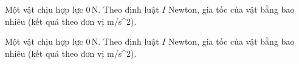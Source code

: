 \begin{bt}
Một vật chịu hợp lực $0\,\text{N}$. Theo định luật $I$ Newton, gia tốc của vật bằng bao nhiêu (kết quả theo đơn vị m/s^2).
\end{bt}

\begin{bt}
Một vật chịu hợp lực $0\,\text{N}$. Theo định luật $I$ Newton, gia tốc của vật bằng bao nhiêu (kết quả theo đơn vị m/s^2).
\end{bt}
